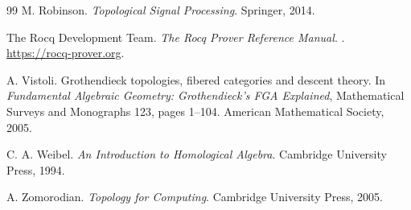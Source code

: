 \documentclass[11pt]{article}
\begin{document}
\begin{thebibliography}{99}
M. Robinson.
\newblock \emph{Topological Signal Processing}.
\newblock Springer, 2014.

The Rocq Development Team.
\newblock \emph{The Rocq Prover Reference Manual}.
. \url{https://rocq-prover.org}.

A. Vistoli.
\newblock Grothendieck topologies, fibered categories and descent theory.
\newblock In \emph{Fundamental Algebraic Geometry: Grothendieck's FGA Explained}, Mathematical Surveys and Monographs 123, pages 1--104. American Mathematical Society, 2005.

C. A. Weibel.
\newblock \emph{An Introduction to Homological Algebra}.
\newblock Cambridge University Press, 1994.

A. Zomorodian.
\newblock \emph{Topology for Computing}.
\newblock Cambridge University Press, 2005.

\end{thebibliography}
\end{document}
